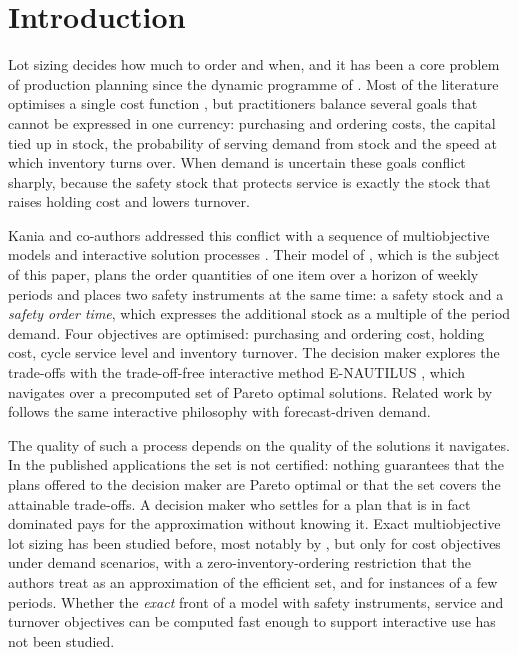 \documentclass[preprint,12pt,authoryear]{elsarticle}
\begin{document}
\section{Introduction}\label{sec:intro}

Lot sizing decides how much to order and when, and it has been a core problem of
production planning since the dynamic programme of \citet{WagnerWhitin1958}. Most of the
literature optimises a single cost function \citep{Brahimi2017}, but practitioners
balance several goals that cannot be expressed in one currency: purchasing and ordering
costs, the capital tied up in stock, the probability of serving demand from stock and the
speed at which inventory turns over. When demand is uncertain these goals conflict
sharply, because the safety stock that protects service is exactly the stock that raises
holding cost and lowers turnover.

Kania and co-authors addressed this conflict with a sequence of multiobjective models and
interactive solution processes \citep{Kania2021ICCL,Kania2022CIE,Kania2024DESMILS,
Kania2023thesis}. Their model of \citet{Kania2022CIE}, which is the subject of this paper,
plans the order quantities of one item over a horizon of weekly periods and places two
safety instruments at the same time: a safety stock and a \emph{safety order time}, which
expresses the additional stock as a multiple of the period demand. Four objectives are
optimised: purchasing and ordering cost, holding cost, cycle service level and inventory
turnover. The decision maker explores the trade-offs with the trade-off-free interactive
method E-NAUTILUS \citep{Ruiz2015ENautilus}, which navigates over a precomputed set of
Pareto optimal solutions. Related work by \citet{Heikkinen2023} follows the same
interactive philosophy with forecast-driven demand.

The quality of such a process depends on the quality of the solutions it navigates. In
the published applications the set is not certified: nothing guarantees that the plans
offered to the decision maker are Pareto optimal or that the set covers the attainable
trade-offs. A decision maker who settles for a plan that is in fact dominated pays for the
approximation without knowing it. Exact multiobjective lot sizing has been studied before,
most notably by \citet{Gutierrez2004}, but only for cost objectives under demand
scenarios, with a zero-inventory-ordering restriction that the authors treat as an
approximation of the efficient set, and for instances of a few periods. Whether the
\emph{exact} front of a model with safety instruments, service and turnover objectives can
be computed fast enough to support interactive use has not been studied.
\end{document}
